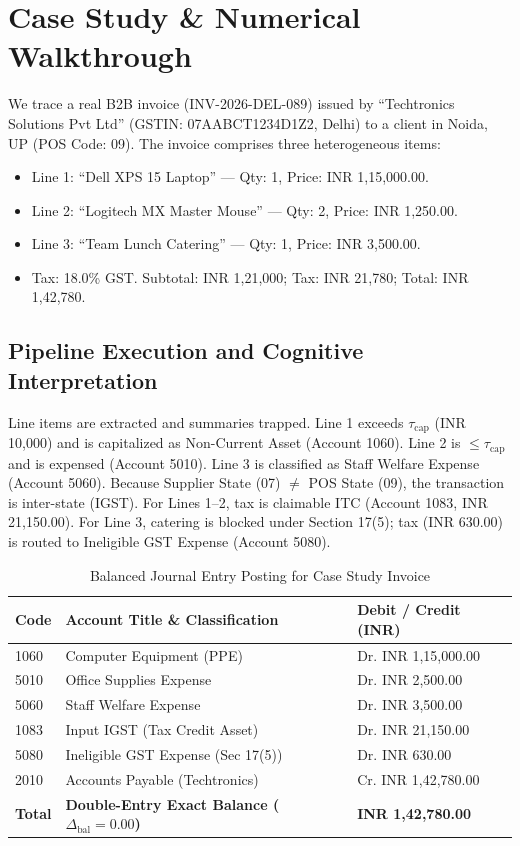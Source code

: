 \documentclass[conference]{IEEEtran}
\begin{document}
\section{Case Study \& Numerical Walkthrough}
We trace a real B2B invoice (INV-2026-DEL-089) issued by ``Techtronics Solutions Pvt Ltd'' (GSTIN: 07AABCT1234D1Z2, Delhi) to a client in Noida, UP (POS Code: 09). The invoice comprises three heterogeneous items:
\begin{itemize}
    \item Line 1: ``Dell XPS 15 Laptop'' --- Qty: 1, Price: INR 1,15,000.00.
    \item Line 2: ``Logitech MX Master Mouse'' --- Qty: 2, Price: INR 1,250.00.
    \item Line 3: ``Team Lunch Catering'' --- Qty: 1, Price: INR 3,500.00.
    \item Tax: 18.0\% GST. Subtotal: INR 1,21,000; Tax: INR 21,780; Total: INR 1,42,780.
\end{itemize}

\subsection{Pipeline Execution and Cognitive Interpretation}
Line items are extracted and summaries trapped. Line 1 exceeds $\tau_{\text{cap}}$ (INR 10,000) and is capitalized as Non-Current Asset (Account 1060). Line 2 is $\le \tau_{\text{cap}}$ and is expensed (Account 5010). Line 3 is classified as Staff Welfare Expense (Account 5060). Because Supplier State (07) $\neq$ POS State (09), the transaction is inter-state (IGST). For Lines 1--2, tax is claimable ITC (Account 1083, INR 21,150.00). For Line 3, catering is blocked under Section 17(5); tax (INR 630.00) is routed to Ineligible GST Expense (Account 5080).

\begin{table}[htbp]
\caption{Balanced Journal Entry Posting for Case Study Invoice}
\begin{center}
\begin{tabularx}{\columnwidth}{llX}
\toprule
\textbf{Code} & \textbf{Account Title \& Classification} & \textbf{Debit / Credit (INR)} \\
\midrule
1060 & Computer Equipment (PPE) & Dr. INR 1,15,000.00 \\
5010 & Office Supplies Expense & Dr. INR 2,500.00 \\
5060 & Staff Welfare Expense & Dr. INR 3,500.00 \\
1083 & Input IGST (Tax Credit Asset) & Dr. INR 21,150.00 \\
5080 & Ineligible GST Expense (Sec 17(5)) & Dr. INR 630.00 \\
2010 & Accounts Payable (Techtronics) & Cr. INR 1,42,780.00 \\
\midrule
\textbf{Total} & \textbf{Double-Entry Exact Balance ($\Delta_{\text{bal}} = 0.00$)} & \textbf{INR 1,42,780.00} \\
\bottomrule
\end{tabularx}
\label{tab:journal}
\end{center}
\end{table}
\end{document}
